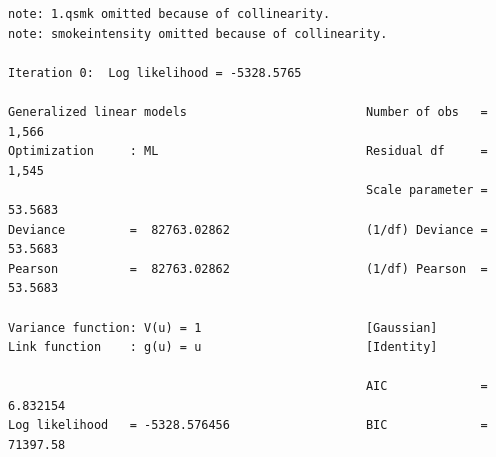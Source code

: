 \documentclass[
  10pt,
  a4paper,
]{book}
\begin{document}
\begin{verbatim}
note: 1.qsmk omitted because of collinearity.
note: smokeintensity omitted because of collinearity.

Iteration 0:  Log likelihood = -5328.5765  

Generalized linear models                         Number of obs   =      1,566
Optimization     : ML                             Residual df     =      1,545
                                                  Scale parameter =    53.5683
Deviance         =  82763.02862                   (1/df) Deviance =    53.5683
Pearson          =  82763.02862                   (1/df) Pearson  =    53.5683

Variance function: V(u) = 1                       [Gaussian]
Link function    : g(u) = u                       [Identity]

                                                  AIC             =   6.832154
Log likelihood   = -5328.576456                   BIC             =   71397.58


\end{verbatim}
\end{document}
